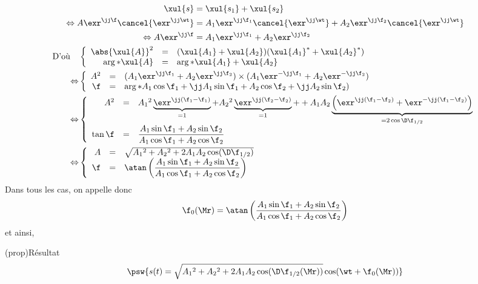 \documentclass[../../main/main.tex]{subfiles}
\begin{document}
\begin{tcb}[breakable]
{\begin{gather*}
			\begin{aligned}
				\xul{s}                             & = \xul{s_1} + \xul{s_2} \\
				\Leftrightarrow
				A\exr^{\jj\f}\cancel{\exr^{\jj\wt}} & =
				A_1\exr^{\jj\f_1}\cancel{\exr^{\jj\wt}} +
				A_2\exr^{\jj\f_2}\cancel{\exr^{\jj\wt}}                       \\
				\Leftrightarrow
				A\exr^{\jj\f}                       & =
				A_1\exr^{\jj\f_1} +
				A_2\exr^{\jj\f_2}
			\end{aligned}\\
			\begin{aligned}
				\text{D'où}\quad &
				\left\{
				\begin{array}{rcl}
					\abs{\xul{A}}^2 & = &
					(\xul{A_1}+\xul{A_2})(\xul{A_1}^* + \xul{A_2}^*) \\
					\arg*{\xul{A}}  & = & \arg*{\xul{A_1}+\xul{A_2}}
				\end{array}
				\right.            \\
				\Leftrightarrow  &
				\left\{
				\begin{array}{rcl}
					A^2 & = &
					(A_1\exr^{\jj\f_1}+A_2\exr^{\jj\f_2})  \times
					(A_1\exr^{-\jj\f_1}+A_2\exr^{-\jj\f_2})      \\
					\f  & = & \arg*{A_1\cos\f_1+ \jj A_1\sin\f_1
					+ A_2\cos\f_2 + \jj A_2\sin\f_2)}            \\
				\end{array}
				\right.            \\
				\Leftrightarrow  &
				\left\{
				\begin{array}{rcl}
					A^2    & = & A_1{}^2
					\underbrace{\exr^{\jj(\f_1-\f_1)}}_{=1} +
					A_2{}^2
					\underbrace{\exr^{\jj(\f_2-\f_2)}}_{=1} +
					+ A_1A_2
					\underbrace{\left(
						\exr^{\jj(\f_1-\f_2)} + \exr^{-\jj(\f_1-\f_2)}
					\right)}_{=2\cos\D\f_{1/2}} \\[2em]
					\tan\f & = &
					\dfrac{A_1\sin\f_1+A_2\sin\f_2}
					{A_1\cos\f_1+A_2\cos\f_2}
				\end{array}
				\right.            \\
				\Leftrightarrow  &
				\left\{
				\begin{array}{rcl}
					A  & = & \sqrt{A_1{}^2+A_2{}^2 + 2A_1A_2\cos(\D\f_{1/2})} \\
					\f & = & \atan
					\left(
					\dfrac{A_1\sin\f_1+A_2\sin\f_2}{A_1\cos\f_1+A_2\cos\f_2}
					\right)
				\end{array}
				\right.
			\end{aligned}
		\end{gather*}}
	\hspace{-20pt}
	Dans tous les cas, on appelle donc
	\[\f_0(\Mr) =
		\atan
		\left(
		\dfrac{A_1\sin\f_1+A_2\sin\f_2}{A_1\cos\f_1+A_2\cos\f_2}
		\right)
	\]
	et ainsi,
\end{tcb}
\begin{tcb}(prop){Résultat}
	\[\psw{
		s(t) = \sqrt{A_1{}^2+A_2{}^2 + 2A_1A_2\cos(\D\f_{1/2}(\Mr))}\cos(\wt+\f_0(\Mr))
		}\]
\end{tcb}
\end{document}
